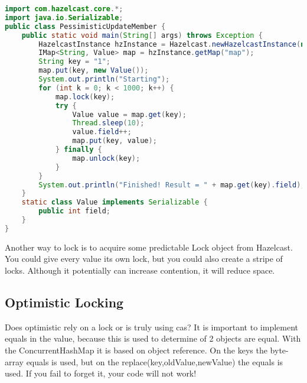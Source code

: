 \begin{lstlisting}[language=java]
import com.hazelcast.core.*;
import java.io.Serializable;
public class PessimisticUpdateMember {
    public static void main(String[] args) throws Exception {
        HazelcastInstance hzInstance = Hazelcast.newHazelcastInstance(null);
        IMap<String, Value> map = hzInstance.getMap("map");
        String key = "1";
        map.put(key, new Value());
        System.out.println("Starting");
        for (int k = 0; k < 1000; k++) {
            map.lock(key);
            try {
                Value value = map.get(key);
                Thread.sleep(10);
                value.field++;
                map.put(key, value);
            } finally {
                map.unlock(key);
            }
        }
        System.out.println("Finished! Result = " + map.get(key).field);
    }
    static class Value implements Serializable {
        public int field;
    }
}
\end{lstlisting}

Another way to lock is to acquire some predictable Lock object from Hazelcast. You could give every value its own lock, but you could also create a stripe of locks. Although it potentially can increase contention, it will reduce space.

\subsection{Optimistic Locking}
Does optimistic rely on a lock or is truly using cas?
It is important to implement equals in the value, because this is used to determine of 2 objects are equal. With the ConcurrentHashMap it is based on object reference. On the keys the byte-array equals is used, but on the replace(key,oldValue,newValue) the equals is used. If you fail to forget it, your code will not work!

